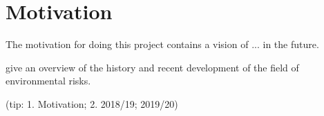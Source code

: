 \section{Motivation} %
The motivation for doing this project contains a vision of ... in the future.

give an overview of the history and recent development of the field of environmental risks.







(tip: 1. Motivation; 2. 2018/19; 2019/20)